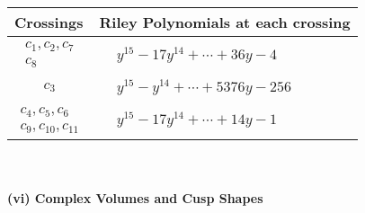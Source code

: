 \documentclass[1p]{elsarticle_modified}
\theoremstyle{definition}
\begin{document}
\begin{tabular}{m{50pt}|m{274pt}}
Crossings & \hspace{64pt}Riley Polynomials at each crossing \\
\hline $$\begin{aligned}c_{1},c_{2},c_{7}\\c_{8}\end{aligned}$$&$\begin{aligned}
&y^{15}-17 y^{14}+\cdots+36 y-4
\end{aligned}$\\
\hline $$\begin{aligned}c_{3}\end{aligned}$$&$\begin{aligned}
&y^{15}- y^{14}+\cdots+5376 y-256
\end{aligned}$\\
\hline $$\begin{aligned}c_{4},c_{5},c_{6}\\c_{9},c_{10},c_{11}\end{aligned}$$&$\begin{aligned}
&y^{15}-17 y^{14}+\cdots+14 y-1
\end{aligned}$\\
\hline
\end{tabular}\\~\\
\newpage\flushleft \textbf{(vi) Complex Volumes and Cusp Shapes}
\end{document}
